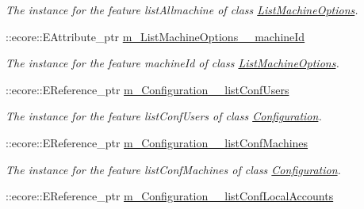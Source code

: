 \begin{DoxyCompactItemize}
\begin{DoxyCompactList}\small\item\em The instance for the feature listAllmachine of class \hyperlink{classUMS__Data_1_1ListMachineOptions}{ListMachineOptions}. \item\end{DoxyCompactList}\item 
\hypertarget{classUMS__Data_1_1UMS__DataPackage_a60ad7798fd15a1543630ba03a5429fe5}{
::ecore::EAttribute\_\-ptr \hyperlink{classUMS__Data_1_1UMS__DataPackage_a60ad7798fd15a1543630ba03a5429fe5}{m\_\-ListMachineOptions\_\-\_\-machineId}}
\label{classUMS__Data_1_1UMS__DataPackage_a60ad7798fd15a1543630ba03a5429fe5}

\begin{DoxyCompactList}\small\item\em The instance for the feature machineId of class \hyperlink{classUMS__Data_1_1ListMachineOptions}{ListMachineOptions}. \item\end{DoxyCompactList}\item 
\hypertarget{classUMS__Data_1_1UMS__DataPackage_a422c6a3b97bf4f034f7598d267edf3b5}{
::ecore::EReference\_\-ptr \hyperlink{classUMS__Data_1_1UMS__DataPackage_a422c6a3b97bf4f034f7598d267edf3b5}{m\_\-Configuration\_\-\_\-listConfUsers}}
\label{classUMS__Data_1_1UMS__DataPackage_a422c6a3b97bf4f034f7598d267edf3b5}

\begin{DoxyCompactList}\small\item\em The instance for the feature listConfUsers of class \hyperlink{classUMS__Data_1_1Configuration}{Configuration}. \item\end{DoxyCompactList}\item 
\hypertarget{classUMS__Data_1_1UMS__DataPackage_a036d42b826a02384f7e98f2a556e87fd}{
::ecore::EReference\_\-ptr \hyperlink{classUMS__Data_1_1UMS__DataPackage_a036d42b826a02384f7e98f2a556e87fd}{m\_\-Configuration\_\-\_\-listConfMachines}}
\label{classUMS__Data_1_1UMS__DataPackage_a036d42b826a02384f7e98f2a556e87fd}

\begin{DoxyCompactList}\small\item\em The instance for the feature listConfMachines of class \hyperlink{classUMS__Data_1_1Configuration}{Configuration}. \item\end{DoxyCompactList}\item 
\hypertarget{classUMS__Data_1_1UMS__DataPackage_acfc9b19feb16297ec0bbfe0df8861801}{
::ecore::EReference\_\-ptr \hyperlink{classUMS__Data_1_1UMS__DataPackage_acfc9b19feb16297ec0bbfe0df8861801}{m\_\-Configuration\_\-\_\-listConfLocalAccounts}}
\label{classUMS__Data_1_1UMS__DataPackage_acfc9b19feb16297ec0bbfe0df8861801}


\end{DoxyCompactItemize}
